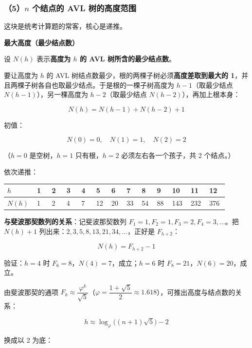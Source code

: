 \documentclass[11pt,openany,UTF8]{ctexbook}
\begin{document}
\subsubsection{（5）$n$ 个结点的 AVL 树的高度范围}

这块是统考计算题的常客，核心是递推。

\textbf{最大高度（最少结点数）}

设 $N(h)$ 表示\textbf{高度为 $h$ 的 AVL 树所含的最少结点数}。

要让高度为 $h$ 的 AVL 树结点数最少，根的两棵子树必须\textbf{高度差取到最大的 1}，并且两棵子树各自也取最少结点。于是根的一棵子树高度为 $h-1$（取最少结点 $N(h-1)$），另一棵高度为 $h-2$（取最少结点 $N(h-2)$），再加上根本身：

\[\boxed{N(h)=N(h-1)+N(h-2)+1}\]

初值：

\[N(0)=0,\quad N(1)=1,\quad N(2)=2\]

（$h=0$ 是空树，$h=1$ 只有根，$h=2$ 必须左右各一个孩子，共 2 个结点。）

依次递推：

\begingroup\footnotesize\setlength{\tabcolsep}{1.5pt}
\begin{longtable}{@{}L{0.0689\linewidth}L{0.0689\linewidth}L{0.0689\linewidth}L{0.0689\linewidth}L{0.0689\linewidth}L{0.0689\linewidth}L{0.0689\linewidth}L{0.0689\linewidth}L{0.0689\linewidth}L{0.0689\linewidth}L{0.0689\linewidth}L{0.0689\linewidth}L{0.0689\linewidth}@{}}
\toprule
\textbf{$h$} & \textbf{1} & \textbf{2} & \textbf{3} & \textbf{4} & \textbf{5} & \textbf{6} & \textbf{7} & \textbf{8} & \textbf{9} & \textbf{10} & \textbf{11} & \textbf{12} \\
\midrule
\endhead
$N(h)$ & 1 & 2 & 4 & 7 & 12 & 20 & 33 & 54 & 88 & 143 & 232 & 376 \\
\bottomrule
\end{longtable}
\endgroup

\textbf{与斐波那契数列的关系}：记斐波那契数列 $F_1=1,F_2=1,F_3=2,F_4=3,\dots$。把 $N(h)+1$ 列出来：$2,3,5,8,13,21,34,\dots$，正好是 $F_{h+2}$：

\[N(h)=F_{h+2}-1\]

验证：$h=4$ 时 $F_6=8$，$N(4)=7$，成立；$h=6$ 时 $F_8=21$，$N(6)=20$，成立。

由斐波那契的通项 $F_k\approx\dfrac{\varphi^{k}}{\sqrt5}$（$\varphi=\dfrac{1+\sqrt5}{2}\approx1.618$），可推出高度与结点数的关系：

\[h\approx \log_\varphi\big((n+1)\sqrt5\big)-2\]

换成以 2 为底：
\end{document}
